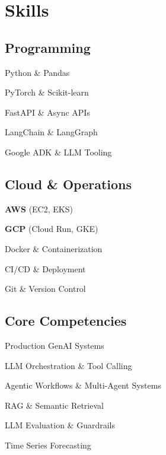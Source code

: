 \documentclass{seb-cv}
\begin{document}
\begin{minipage}[t]{0.31\textwidth}

\section{Skills}

\subsection{Programming}
\begin{tightemize}
  \item Python \& Pandas
  \item PyTorch \& Scikit-learn
  \item FastAPI \& Async APIs
  \item LangChain \& LangGraph
  \item Google ADK \& LLM Tooling
\end{tightemize}

\entrysep

\subsection{Cloud \& Operations}
\begin{tightemize}
  \item \textbf{AWS} (EC2, EKS)
  \item \textbf{GCP} (Cloud Run, GKE)
  \item Docker \& Containerization
  \item CI/CD \& Deployment
  \item Git \& Version Control
\end{tightemize}

\entrysep

\subsection{Core Competencies}
\begin{tightemize}
  \item Production GenAI Systems
  \item LLM Orchestration \& Tool Calling
  \item Agentic Workflows \& Multi-Agent Systems
  \item RAG \& Semantic Retrieval
  \item LLM Evaluation \& Guardrails
  \item Time Series Forecasting
\end{tightemize}


\end{minipage}
\end{document}
